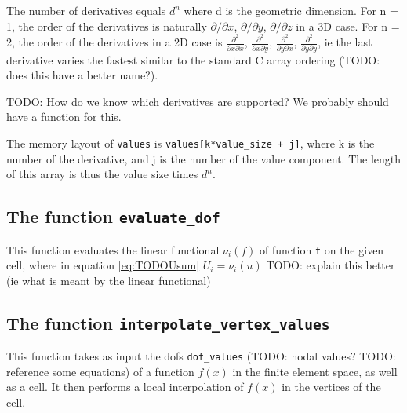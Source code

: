 The number of derivatives equals $d^n$ where d is the geometric dimension.
For n = 1, the order of the derivatives is naturally
$\partial/\partial x$, $\partial/\partial y$, $\partial/\partial z$
in a 3D case.
For n = 2, the order of the derivatives in a 2D case is 
  $\frac{\partial^2}{\partial x\partial x}$,
  $\frac{\partial^2}{\partial x\partial y}$,
  $\frac{\partial^2}{\partial y\partial x}$,
  $\frac{\partial^2}{\partial y\partial y}$,
ie the last derivative varies the fastest similar to the standard C array ordering (TODO: does this have a better name?).

TODO: How do we know which derivatives are supported? We probably should have a function for this.

The memory layout of \texttt{values} is
\texttt{values[k*value\_size + j]},
where k is the number of the derivative,
and j is the number of the value component.
The length of this array is thus the value size times $d^n$.



\subsection{The function \texttt{evaluate\_dof}}
This function evaluates the linear functional $\nu_i(f)$ of function \texttt{f}
on the given cell, where in equation \eqref{eq:TODOUsum} $U_i = \nu_i(u)$
TODO: explain this better (ie what is meant by the linear functional)


\subsection{The function \texttt{interpolate\_vertex\_values}}
This function takes as input the dofs \texttt{dof\_values} (TODO: nodal values? TODO: reference some equations)
of a function $f(x)$ in the finite element space, as well as a cell.
It then performs a local interpolation of $f(x)$ in the vertices of the cell.


